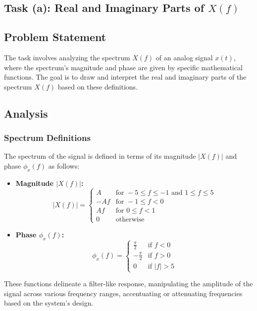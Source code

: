 
\item[(a)]
\subsection{Task (a): Real and Imaginary Parts of $X(f)$}

\subsection{Problem Statement}
The task involves analyzing the spectrum $X(f)$ of an analog signal $x(t)$, where the spectrum's magnitude and phase are given by specific mathematical functions. The goal is to draw and interpret the real and imaginary parts of the spectrum $X(f)$ based on these definitions.

\subsection{Analysis}
\subsubsection{Spectrum Definitions}
The spectrum of the signal is defined in terms of its magnitude $|X(f)|$ and phase $\phi_x(f)$ as follows:
\begin{itemize}
    \item \textbf{Magnitude $|X(f)|$:}
    \[
    |X(f)| =
    \begin{cases}
    A & \text{for } -5 \leq f \leq -1 \text{ and } 1 \leq f \leq 5 \\
    -Af & \text{for } -1 \leq f < 0 \\
    Af & \text{for } 0 \leq f < 1 \\
    0 & \text{otherwise}
    \end{cases}
    \]
    \item \textbf{Phase $\phi_x(f)$:}
    \[
    \phi_x(f) =
    \begin{cases}
    \frac{\pi}{2} & \text{if } f < 0 \\
    -\frac{\pi}{2} & \text{if } f > 0 \\
    0 & \text{if } |f| > 5
    \end{cases}
    \]
\end{itemize}
These functions delineate a filter-like response, manipulating the amplitude of the signal across various frequency ranges, accentuating or attenuating frequencies based on the system's design.


